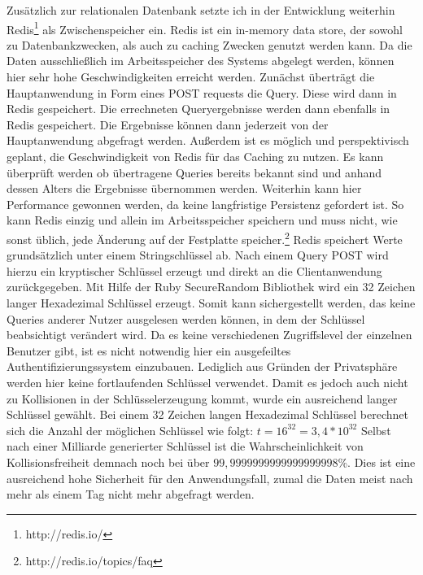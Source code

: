 Zusätzlich zur relationalen Datenbank setzte ich in der Entwicklung weiterhin Redis\footnote{http://redis.io/} als Zwischenspeicher ein. Redis ist ein in-memory data store, der sowohl zu Datenbankzwecken, als auch zu caching Zwecken genutzt werden kann. Da die Daten ausschließlich im Arbeitsspeicher des Systems abgelegt werden, können hier sehr hohe Geschwindigkeiten erreicht werden.
Zunächst überträgt die Hauptanwendung in Form eines POST requests die Query. Diese wird dann in Redis gespeichert. Die errechneten Queryergebnisse werden dann ebenfalls in Redis gespeichert. Die Ergebnisse können dann jederzeit von der Hauptanwendung abgefragt werden. Außerdem ist es möglich und perspektivisch geplant, die Geschwindigkeit von Redis für das Caching zu nutzen. Es kann überprüft werden ob übertragene Queries bereits bekannt sind und anhand dessen Alters die Ergebnisse übernommen werden. Weiterhin kann hier Performance gewonnen werden, da keine langfristige Persistenz gefordert ist. So kann Redis einzig und allein im Arbeitsspeicher speichern und muss nicht, wie sonst üblich, jede Änderung auf der Festplatte speicher.\footnote{http://redis.io/topics/faq}
Redis speichert Werte grundsätzlich unter einem Stringschlüssel ab. Nach einem Query POST wird hierzu ein kryptischer Schlüssel erzeugt und direkt an die Clientanwendung zurückgegeben. Mit Hilfe der Ruby SecureRandom Bibliothek wird ein 32 Zeichen langer Hexadezimal Schlüssel erzeugt. Somit kann sichergestellt werden, das keine Queries anderer Nutzer ausgelesen werden können, in dem der Schlüssel beabsichtigt verändert wird. Da es keine verschiedenen Zugriffslevel der einzelnen Benutzer gibt, ist es nicht notwendig hier ein ausgefeiltes Authentifizierungssystem einzubauen. Lediglich aus Gründen der Privatsphäre werden hier keine fortlaufenden Schlüssel verwendet.
Damit es jedoch auch nicht zu Kollisionen in der Schlüsselerzeugung kommt, wurde ein ausreichend langer Schlüssel gewählt. Bei einem 32 Zeichen langen Hexadezimal Schlüssel berechnet sich die Anzahl der möglichen Schlüssel wie folgt:
$ t = 16^{32} = 3,4 * 10^{32} $
Selbst nach einer Milliarde generierter Schlüssel ist die Wahrscheinlichkeit von Kollisionsfreiheit demnach noch bei über $99,9999999999999999998$\%.%
Dies ist eine ausreichend hohe Sicherheit für den Anwendungsfall, zumal die Daten meist nach mehr als einem Tag nicht mehr abgefragt werden.

